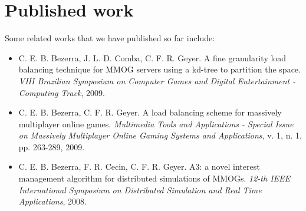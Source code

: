 \documentclass[]{usiinfprospectus}
\begin{document}
\section{Published work} \label{sec:achievements}

Some related works that we have published so far include:
\begin{itemize}
  \item C. E. B. Bezerra, J. L. D. Comba, C. F. R. Geyer. A fine granularity load balancing technique for MMOG servers using a kd-tree to partition the space. \textit{VIII Brazilian Symposium on Computer Games and Digital Entertainment - Computing Track}, 2009.
  \item C. E. B. Bezerra, C. F. R. Geyer. A load balancing scheme for massively multiplayer online games. \textit{Multimedia Tools and Applications - Special Issue on Massively Multiplayer Online Gaming Systems and Applications}, v. 1, n. 1, pp. 263-289, 2009.
  \item C. E. B. Bezerra, F. R. Cecin, C. F. R. Geyer. A3: a novel interest management algorithm for distributed simulations of MMOGs. \textit{12-th IEEE International Symposium on Distributed Simulation and Real Time Applications}, 2008.
\end{itemize}





\end{document}
